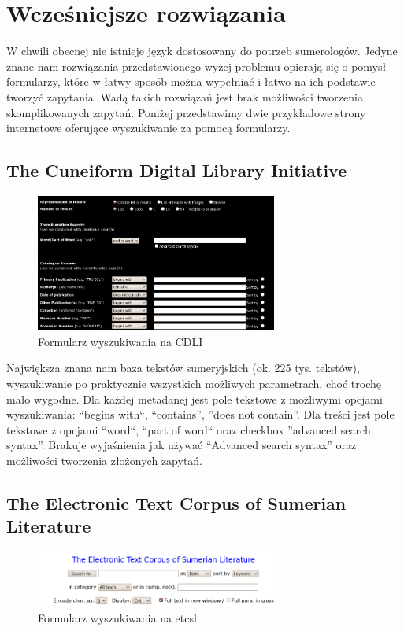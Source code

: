 \chapter{Wcześniejsze rozwiązania}\label{r:losers}
W chwili obecnej nie istnieje język dostosowany do potrzeb sumerologów. Jedyne znane nam rozwiązania przedstawionego wyżej problemu opierają się o pomysł formularzy, które w łatwy sposób można wypełniać i łatwo na ich podstawie tworzyć zapytania. Wadą takich rozwiązań jest brak możliwości tworzenia skomplikowanych zapytań.
Poniżej przedstawimy dwie przykładowe strony internetowe oferujące wyszukiwanie za pomocą formularzy.
\section{The Cuneiform Digital Library Initiative \cite{cdli}}
\begin{figure}[h]
 \centering
 \includegraphics[width=300px]{../diagramy/cdli-search.png}
 \caption{Formularz wyszukiwania na CDLI}
 \label{fig:cdli-search}
\end{figure}

Największa znana nam baza tekstów sumeryjskich (ok. 225 tys. tekstów), 
wyszukiwanie po praktycznie wszystkich możliwych parametrach, choć trochę mało wygodne. 
Dla każdej metadanej jest pole tekstowe z możliwymi opcjami wyszukiwania: ``begins with``, ``contains'', ''does not contain''. 
Dla treści jest pole tekstowe z opcjami ``word``, ``part of word`` oraz checkbox ''advanced search syntax''. 
Brakuje wyjaśnienia jak 
używać ``Advanced search syntax'' oraz możliwości tworzenia złożonych zapytań.

\section{The Electronic Text Corpus of Sumerian Literature \cite{etcsl}} 
\begin{figure}[h]
 \centering
 \includegraphics[width=300px]{../diagramy/etcsl-search.png}
 \caption{Formularz wyszukiwania na etcsl}
 \label{fig:etcsl-search}
\end{figure}

